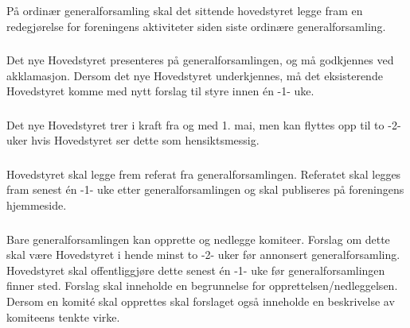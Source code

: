 \subsubsection{}
På ordinær generalforsamling skal det sittende hovedstyret legge fram en
redegjørelse for foreningens aktiviteter siden siste ordinære
generalforsamling.

\subsubsection{}
Det nye Hovedstyret presenteres på generalforsamlingen, og må godkjennes ved
akklamasjon. Dersom det nye Hovedstyret underkjennes, må det eksisterende
Hovedstyret komme med nytt forslag til styre innen én -1- uke.

\subsubsection{}
Det nye Hovedstyret trer i kraft fra og med 1. mai, men kan flyttes opp til to
-2- uker hvis Hovedstyret ser dette som hensiktsmessig.

\subsubsection{}
Hovedstyret skal legge frem referat fra generalforsamlingen. Referatet skal
legges fram senest én -1- uke etter generalforsamlingen og skal publiseres på
foreningens hjemmeside.

\subsubsection{}
Bare generalforsamlingen kan opprette og nedlegge komiteer. Forslag om dette
skal være Hovedstyret i hende minst to -2- uker før annonsert
generalforsamling. Hovedstyret skal offentliggjøre dette senest én -1- uke før
generalforsamlingen finner sted. Forslag skal inneholde en begrunnelse for
opprettelsen/nedleggelsen. Dersom en komité skal opprettes skal forslaget også
inneholde en beskrivelse av komiteens tenkte virke.

